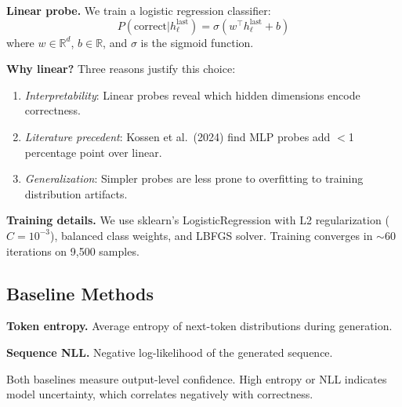 \textbf{Linear probe.} We train a logistic regression classifier:
\begin{equation}
P(\text{correct} | h_\ell^{\text{last}}) = \sigma(w^\top h_\ell^{\text{last}} + b)
\end{equation}
where $w \in \mathbb{R}^d$, $b \in \mathbb{R}$, and $\sigma$ is the sigmoid function.

\textbf{Why linear?} Three reasons justify this choice:
\begin{enumerate}
    \item \emph{Interpretability}: Linear probes reveal which hidden dimensions encode correctness.
    \item \emph{Literature precedent}: Kossen et al.\ (2024) find MLP probes add $<$1 percentage point over linear.
    \item \emph{Generalization}: Simpler probes are less prone to overfitting to training distribution artifacts.
\end{enumerate}

\textbf{Training details.} We use sklearn's LogisticRegression with L2 regularization ($C = 10^{-3}$), balanced class weights, and LBFGS solver. Training converges in $\sim$60 iterations on 9,500 samples.

\subsection{Baseline Methods}

\textbf{Token entropy.} Average entropy of next-token distributions during generation.

\textbf{Sequence NLL.} Negative log-likelihood of the generated sequence.

Both baselines measure output-level confidence. High entropy or NLL indicates model uncertainty, which correlates negatively with correctness.
